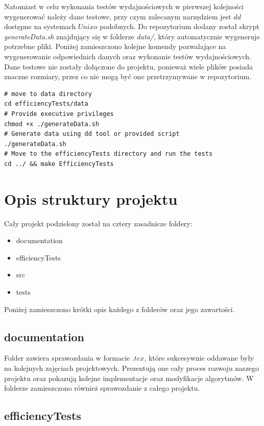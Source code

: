 \documentclass{article}
\begin{document}
Natomiast w celu wykonania testów wydajnościowych w pierwszej kolejności wygenerować należy dane testowe, przy czym zalecanym narzędziem jest $dd$ dostępne na systemach $Unixo$ podobnych. Do repozytorium dodany został skrypt \textit{generateData.sh} znajdujący się w folderze \textit{data/}, który automatycznie wygeneruje potrzebne pliki. Poniżej zamieszczono kolejne komendy pozwalające na wygenerowanie odpowiednich danych oraz wykonanie testów wydajnościowych. Dane testowe nie zostały dołączone do projektu, ponieważ wiele plików posiada znaczne rozmiary, przez co nie mogą być one przetrzymywane w repozytorium.

\begin{verbatim}
# move to data directory
cd efficiencyTests/data
# Provide executive privileges
chmod +x ./generateData.sh
# Generate data using dd tool or provided script
./generateData.sh
# Move to the efficiencyTests directory and run the tests
cd ../ && make EfficiencyTests
\end{verbatim}



\section{Opis struktury projektu}

Cały projekt podzielony został na cztery zasadnicze foldery: 
\begin{itemize}
    \item documentation
    \item efficiencyTests
    \item src
    \item tests
\end{itemize}

Poniżej zamieszczono krótki opis każdego z folderów oraz jego zawartości.

\subsection{documentation}

Folder zawiera sprawozdania w formacie $.tex$, które sukcesywnie oddawane były na kolejnych zajęciach projektowych. Prezentują one cały proces rozwoju naszego projektu oraz pokazują kolejne implementacje oraz modyfikacje algorytmów. W folderze zamieszczono również sprawozdanie z całego projektu.

\subsection{efficiencyTests}
\end{document}
